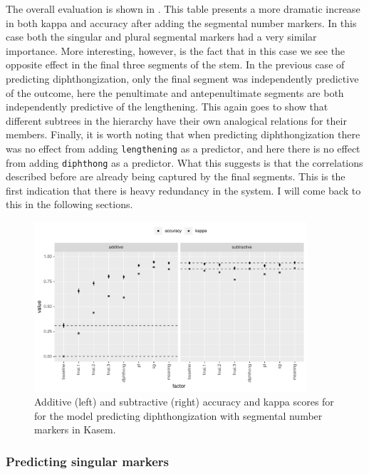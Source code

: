 The overall evaluation is shown in . This table presents a more dramatic increase in both kappa and accuracy after adding the segmental number markers. In this case both the singular and plural segmental markers had a very similar importance. More interesting, however, is the fact that in this case we see the opposite effect in the final three segments of the stem. In the previous case of predicting diphthongization, only the final segment was independently predictive of the outcome, here the penultimate and antepenultimate segments are both independently predictive of the lengthening. This again goes to show that different subtrees in the hierarchy have their own analogical relations for their members. Finally, it is worth noting that when predicting diphthongization there was no effect from adding \texttt{lengthening} as a predictor, and here there is no effect from adding \texttt{diphthong} as a predictor. What this suggests is that the correlations described before are already being captured by the final segments. This is the first indication that there is heavy redundancy in the system. I will come back to this in the following sections.

\begin{figure}[!htpb]
  \centering
  \includegraphics[width=0.9\textwidth]{./figures/kasem/p-fi-length-sg-overall.pdf}
  \caption{Additive (left) and subtractive (right) accuracy and kappa scores for for the model predicting diphthongization with segmental number markers in Kasem.}\label{fig:overall-fi-length}
\end{figure}

\subsubsection{Predicting singular markers}

